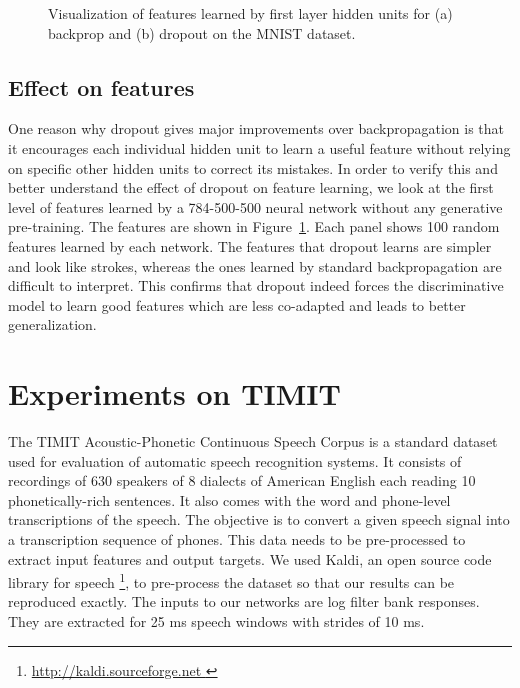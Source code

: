 \documentclass[12pt]{article}
\begin{document}
\begin{figure}[ht]
\centerline{
}
\caption{Visualization of features learned by first layer hidden units for (a)
backprop and (b) dropout on the MNIST dataset.}
\label{fig:features}
\end{figure}
\subsection{Effect on features}
One reason why dropout gives major improvements over backpropagation is that it encourages each individual
hidden unit to learn a useful feature without relying on specific other hidden units to
correct its mistakes.  In order to verify this and better understand the effect
of dropout on feature learning, we look at the first level of features learned by a 784-500-500
neural network without any generative pre-training. The features are shown in Figure~\ref{fig:features}. Each panel shows 100 random
features learned by each network. The features that dropout
learns are simpler and look like strokes, whereas the ones learned by 
standard backpropagation are difficult to interpret. This
confirms that dropout indeed forces the discriminative model to learn
good features which are less co-adapted and leads to better generalization.



\section{Experiments on TIMIT}
\label{timitsom}
The TIMIT Acoustic-Phonetic Continuous Speech Corpus is a standard dataset used
for evaluation of automatic speech recognition systems. It consists of
recordings of 630 speakers of 8 dialects of American English each
reading 10 phonetically-rich sentences. It also comes with the word and
phone-level transcriptions of the speech. The objective is to convert a given 
speech signal into a transcription sequence of phones.
This data needs to be pre-processed to extract input features and output targets.
We used Kaldi, an open source code library for speech
\footnote{\url{ http://kaldi.sourceforge.net }}, to
pre-process the dataset so that our results can be reproduced exactly.
The inputs to our networks are log filter bank responses. They are extracted
for 25 ms speech windows with strides of 10 ms. 
\end{document}

